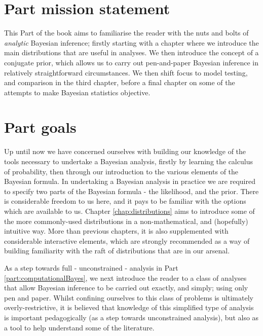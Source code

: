 \documentclass[11pt,fullpage]{book}
\begin{document}
\section{Part mission statement}
This Part of the book aims to familiarise the reader with the nuts and bolts of \textit{analytic} Bayesian inference; firstly starting with a chapter where we introduce the main distributions that are useful in analyses. We then introduce the concept of a conjugate prior, which allows us to carry out pen-and-paper Bayesian inference in relatively straightforward circumstances. We then shift focus to model testing, and comparison in the third chapter, before a final chapter on some of the attempts to make Bayesian statistics objective.

\section{Part goals}
Up until now we have concerned ourselves with building our knowledge of the tools necessary to undertake a Bayesian analysis, firstly by learning the calculus of probability, then through our introduction to the various elements of the Bayesian formula. In undertaking a Bayesian analysis in practice we are required to specify two parts of the Bayesian formula - the likelihood, and the prior. There is considerable freedom to us here, and it pays to be familiar with the options which are available to us. Chapter \ref{chap:distributions} aims to introduce some of the more commonly-used distributions in a non-mathematical, and (hopefully) intuitive way. More than previous chapters, it is also supplemented with considerable interactive elements, which are strongly recommended as a way of building familiarity with the raft of distributions that are in our arsenal.

As a step towards full - unconstrained - analysis in Part \ref{part:computationalBayes}, we next introduce the reader to a class of analyses that allow Bayesian inference to be carried out exactly, and simply; using only pen and paper. Whilst confining ourselves to this class of problems is ultimately overly-restrictive, it is believed that knowledge of this simplified type of analysis is important pedagogically (as a step towards unconstrained analysis), but also as a tool to help understand some of the literature.
\end{document}
